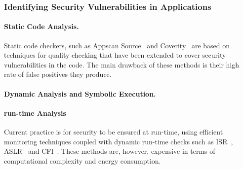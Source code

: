 \documentclass[a4paper,11pt]{article}
\begin{document}
\subsubsection{Identifying Security Vulnerabilities in Applications}
\label{sect:background-first}
\label{sect:identifying}

\paragraph{Static Code Analysis.}
Static code checkers, such as Appscan Source~\cite{AppScan} and Coverity~\cite{Coverity} are based on techniques for quality checking that have been extended to cover security vulnerabilities in the code. The main drawback of  these methods is their high rate of false positives they produce. 

\paragraph{Dynamic Analysis and Symbolic Execution.}

\paragraph{run-time Analysis}
Current practice is for security to be ensured at run-time, using efficient monitoring techniques coupled with dynamic run-time checks such as ISR~\cite{isr}, ASLR~\cite{aslr} and CFI~\cite{cfi}. These methods are, however, expensive in terms of computational complexity and energy consumption. 
\end{document}
